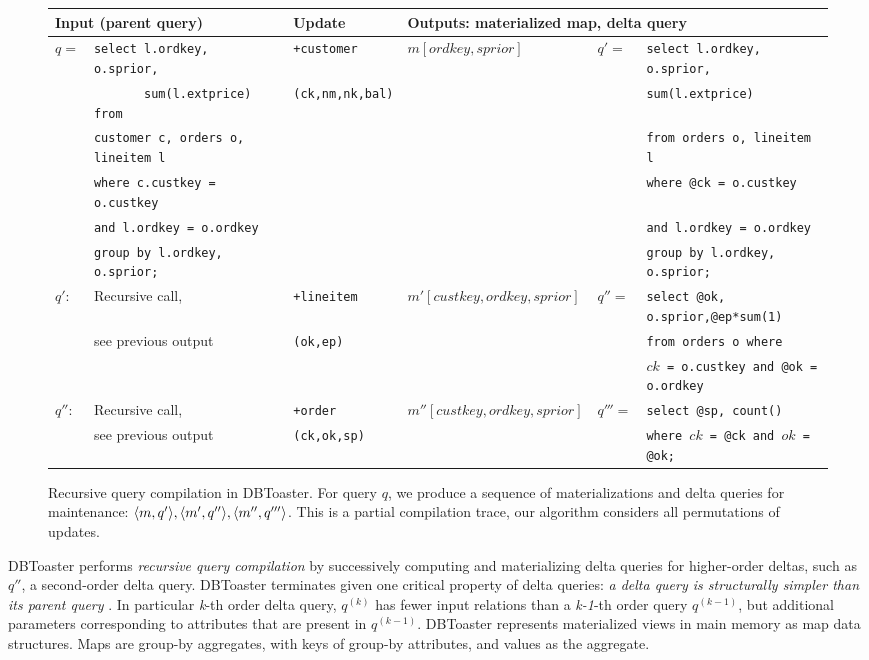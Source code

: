 \def \sql#1{{\scriptsize {\tt #1}}}
\begin{figure*}[htbp]

\vspace{-8mm}

\begin{tabular}{ll|l|l|ll}
\multicolumn{2}{l}{Input (parent query)}
& Update 
& \multicolumn{3}{l}{Outputs: materialized map, delta query}
\\
\hline
$q =$
& \sql{select l.ordkey, o.sprior,}
& \texttt{+customer}
& $m[ordkey,sprior]$
& $q' =$
& \sql{select l.ordkey, o.sprior,}
\\
& \sql{\ \ \ \ \ \ \ sum(l.extprice) from}
& \texttt{(ck,nm,nk,bal)}
& & & \sql{sum(l.extprice)}
\\
& \sql{customer c, orders o, lineitem l}
& & & & \sql{from orders o, lineitem l}
\\
& \sql{where c.custkey = o.custkey}
& & & & \sql{where @ck = o.custkey} 
\\
& \sql{and l.ordkey = o.ordkey}
& & & & \sql{and l.ordkey = o.ordkey}
\\
& \sql{group by l.ordkey, o.sprior;}
& & & & \sql{group by l.ordkey, o.sprior;}
\\
\hline
$q'$:
& Recursive call,
& \texttt{+lineitem} 
& $m'[custkey,ordkey,sprior]$
& $q'' =$ & \sql{select @ok, o.sprior,@ep*sum(1)}
\\
& see previous output
& \texttt{(ok,ep)} & & & \sql{from orders o where}
\\
& & & & & \sql{$ck$ = o.custkey and @ok = o.ordkey}
\\
\hline
$q''$:
& Recursive call,
& \texttt{+order} 
& $m''[custkey,ordkey,sprior]$
& $q'''=$ & \sql{select @sp, count()}
\\
& see previous output
& \texttt{(ck,ok,sp)}
& & & \sql{where $ck$ = @ck and $ok$ = @ok;}
\end{tabular}
\caption{Recursive query compilation in DBToaster. For query $q$, we produce a
sequence of materializations and delta queries for maintenance: ${\langle m,q'\rangle},
{\langle m',q''\rangle}, {\langle m'',q'''\rangle}$. This is a partial compilation trace, our
algorithm considers all permutations of updates.}
\label{fig:compex}
\vspace{-4mm}
\end{figure*}

DBToaster performs \textit{recursive query compilation} by successively
computing and materializing delta queries for higher-order deltas, such as
$q''$, a second-order delta query. DBToaster terminates given one critical
property of delta queries: \textit{a delta query is structurally simpler than
its parent query} \cite{koch-pods:10}. In particular \textit{k}-th order delta
query, $q^{(k)}$ has fewer input relations than a \textit{k-1}-th order query
$q^{(k-1)}$, but additional parameters corresponding to attributes that are
present in $q^{(k-1)}$. DBToaster represents materialized views in main memory
as map data structures. Maps are group-by aggregates, with keys of group-by
attributes, and values as the aggregate.


